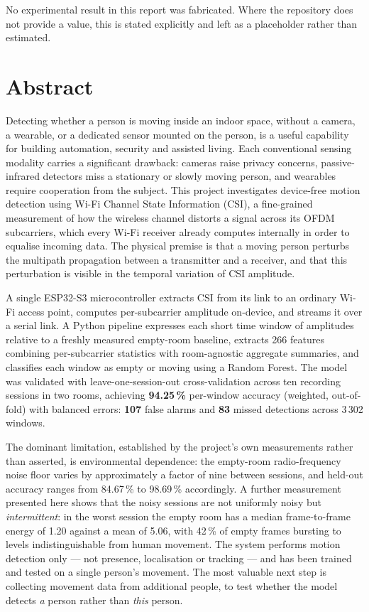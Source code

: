 \documentclass[11pt,a4paper,oneside]{report}
\begin{document}
\noindent
No experimental result in this report was fabricated. Where the repository does
not provide a value, this is stated explicitly and left as a placeholder rather
than estimated.

\medskip
\noindent

\chapter*{Abstract}

Detecting whether a person is moving inside an indoor space, without a camera,
a wearable, or a dedicated sensor mounted on the person, is a useful capability
for building automation, security and assisted living. Each conventional
sensing modality carries a significant drawback: cameras raise privacy
concerns, passive-infrared detectors miss a stationary or slowly moving person,
and wearables require cooperation from the subject. This project investigates
device-free motion detection using Wi-Fi Channel State Information (CSI), a
fine-grained measurement of how the wireless channel distorts a signal across
its OFDM subcarriers, which every Wi-Fi receiver already computes internally in
order to equalise incoming data. The physical premise is that a moving person
perturbs the multipath propagation between a transmitter and a receiver, and
that this perturbation is visible in the temporal variation of CSI amplitude.

A single ESP32-S3 microcontroller extracts CSI from its link to an ordinary
Wi-Fi access point, computes per-subcarrier amplitude on-device, and streams it
over a serial link. A Python pipeline expresses each short time window of
amplitudes relative to a freshly measured empty-room baseline, extracts 266
features combining per-subcarrier statistics with room-agnostic aggregate
summaries, and classifies each window as empty or moving using a Random Forest.
The model was validated with leave-one-session-out cross-validation across ten
recording sessions in two rooms, achieving \textbf{94.25\,\%} per-window
accuracy (weighted, out-of-fold) with balanced errors: \textbf{107} false
alarms and \textbf{83} missed detections across 3\,302 windows.

The dominant limitation, established by the project's own measurements rather
than asserted, is environmental dependence: the empty-room radio-frequency
noise floor varies by approximately a factor of nine between sessions, and
held-out accuracy ranges from 84.67\,\% to 98.69\,\% accordingly. A further
measurement presented here shows that the noisy sessions are not uniformly
noisy but \emph{intermittent}: in the worst session the empty room has a median
frame-to-frame energy of 1.20 against a mean of 5.06, with 42\,\% of empty
frames bursting to levels indistinguishable from human movement. The system
performs motion detection only --- not presence, localisation or tracking ---
and has been trained and tested on a single person's movement. The most
valuable next step is collecting movement data from additional people, to test
whether the model detects \emph{a} person rather than \emph{this} person.
\end{document}

